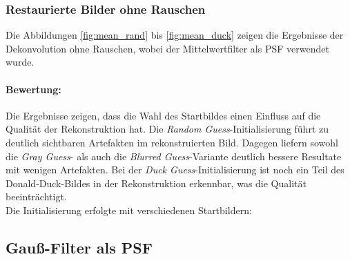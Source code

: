 \subsubsection{Restaurierte Bilder ohne Rauschen}

Die Abbildungen \ref{fig:mean_rand} bis \ref{fig:mean_duck} zeigen die Ergebnisse der Dekonvolution ohne Rauschen, wobei der Mittelwertfilter als PSF verwendet wurde.

\paragraph{Bewertung:} 
Die Ergebnisse zeigen, dass die Wahl des Startbildes einen Einfluss auf die Qualität der Rekonstruktion hat. Die \textit{Random Guess}-Initialisierung führt zu deutlich sichtbaren Artefakten im rekonstruierten Bild. Dagegen liefern sowohl die \textit{Gray Guess}- als auch die \textit{Blurred Guess}-Variante deutlich bessere Resultate mit wenigen Artefakten. Bei der \textit{Duck Guess}-Initialisierung ist noch ein Teil des Donald-Duck-Bildes in der Rekonstruktion erkennbar, was die Qualität beeinträchtigt. \\

\noindent
Die Initialisierung erfolgte mit verschiedenen Startbildern:

\noindent
\begin{minipage}[t]{0.5\textwidth}
\end{minipage}
%
\begin{minipage}[t]{0.5\textwidth}
\end{minipage}

\noindent
\begin{minipage}[t]{0.5\textwidth}
\end{minipage}
%
\begin{minipage}[t]{0.5\textwidth}
\end{minipage}


\newpage
\subsection{Gauß-Filter als PSF}

